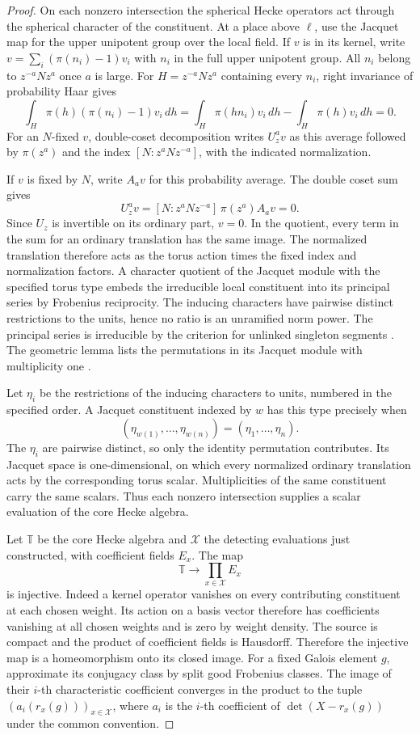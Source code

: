 \begin{proof}
On each nonzero intersection the spherical Hecke
operators act through the spherical character of the
constituent. At a place above \(\ell\), use the Jacquet
map for the upper unipotent group over the local field.
If \(v\) is in its kernel, write
\(v=\sum_i(\pi(n_i)-1)v_i\) with \(n_i\) in the full
upper unipotent group. All \(n_i\) belong to \(z^{-a}Nz^a\)
once \(a\) is large. For \(H=z^{-a}Nz^a\) containing every \(n_i\), right invariance of probability Haar gives
\[
 \int_H \pi(h)(\pi(n_i)-1)v_i\,dh
 =\int_H \pi(hn_i)v_i\,dh-\int_H\pi(h)v_i\,dh=0 .
\]
For an \(N\)-fixed \(v\), double-coset decomposition writes
\(U_z^a v\) as this average followed by \(\pi(z^a)\) and the
index \([N:z^aNz^{-a}]\), with the indicated normalization.

If \(v\) is fixed by \(N\), write \(A_a v\) for this
probability average. The double coset sum gives
\[
       U_z^a v=[N:z^aNz^{-a}]\,\pi(z^a)A_av=0.
\]
Since \(U_z\) is invertible on its ordinary part, \(v=0\). In the quotient, every term in the sum for
an ordinary translation has the same image. The
normalized translation therefore acts as the torus
action times the fixed index and normalization factors.
A character quotient of the Jacquet module with the
specified torus type embeds the irreducible local
constituent into its principal series by Frobenius
reciprocity. The inducing characters
have pairwise distinct restrictions to the units,
hence no ratio is an unramified norm power. The
principal series is irreducible by the criterion for
unlinked singleton segments \cite[Theorem 4.2]{zelevinsky}.
The geometric lemma lists the permutations in its
Jacquet module with multiplicity one
\cite[Sections 2.9 and 2.12]{bernstein-zelevinsky}.

Let \(\eta_i\) be the restrictions of the inducing characters to units, numbered in the specified order. A Jacquet constituent indexed by \(w\) has this type precisely when
\[
 (\eta_{w(1)},\ldots,\eta_{w(n)})=(\eta_1,\ldots,\eta_n).
\]
The \(\eta_i\) are pairwise distinct, so only the identity permutation contributes. Its Jacquet space
is one-dimensional, on which every normalized
ordinary translation acts by the corresponding
torus scalar. Multiplicities of the same constituent
carry the same scalars. Thus each nonzero intersection
supplies a scalar evaluation of the core Hecke algebra.

Let \(\mathbb T\) be the core Hecke algebra and
\(\mathcal X\) the detecting evaluations just constructed,
with coefficient fields \(E_x\). The map
\[
                 \mathbb T\longrightarrow\prod_{x\in\mathcal X}E_x
\]
is injective. Indeed a kernel operator vanishes on every
contributing constituent at each chosen weight. Its action
on a basis vector therefore has coefficients vanishing at
all chosen weights and is zero by weight density.
The source is compact and the product of coefficient fields
is Hausdorff. Therefore the injective map is a homeomorphism
onto its closed image.
For a fixed Galois element \(g\), approximate its conjugacy
class by split good Frobenius classes. The image of their
\(i\)-th characteristic coefficient converges in the product
to the tuple \((a_i(r_x(g)))_{x\in\mathcal X}\), where \(a_i\)
is the \(i\)-th coefficient of \(\det(X-r_x(g))\)
under the common convention.


\end{proof}
